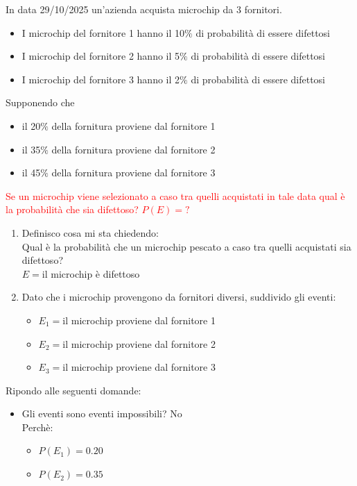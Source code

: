 \documentclass{article}  %
\theoremstyle{definition}
\begin{document}
\begin{esercizio}[Esercizio 2]
	In data 29/10/2025 un'azienda acquista microchip da 3 fornitori.
	\begin{itemize}
		\item I microchip del fornitore 1 hanno il 10$\%$ di probabilità di essere difettosi
		\item I microchip del fornitore 2 hanno il 5$\%$ di probabilità di essere difettosi
		\item I microchip del fornitore 3 hanno il 2$\%$ di probabilità di essere difettosi
	\end{itemize}
	Supponendo che
	\begin{itemize}
		\item il 20$\%$ della fornitura proviene dal fornitore 1
		\item il 35$\%$ della fornitura proviene dal fornitore 2
		\item il 45$\%$ della fornitura proviene dal fornitore 3
	\end{itemize}
	\textcolor{red}{Se un microchip viene selezionato a caso tra quelli acquistati in tale data qual è la probabilità che sia difettoso? $P(E)=?$}
	\begin{enumerate}
		\item Definisco cosa mi sta chiedendo: \\
		      Qual è la probabilità che un microchip pescato a caso tra quelli acquistati sia difettoso? \\
		      $E=$il microchip è difettoso
		\item Dato che i microchip provengono da fornitori diversi, suddivido gli eventi:
		      \begin{itemize}
			      \item $E_1=$il microchip proviene dal fornitore 1
			      \item $E_2=$il microchip proviene dal fornitore 2
			      \item $E_3=$il microchip proviene dal fornitore 3
		      \end{itemize}
	\end{enumerate}
	Ripondo alle seguenti domande:
	\begin{itemize}
		\item Gli eventi sono eventi impossibili? No \\
		      Perchè:
		      \begin{itemize}
			      \item $P(E_1)=0.20$
			      \item $P(E_2)=0.35$

\end{itemize}
\end{itemize}
\end{esercizio}
\end{document}

